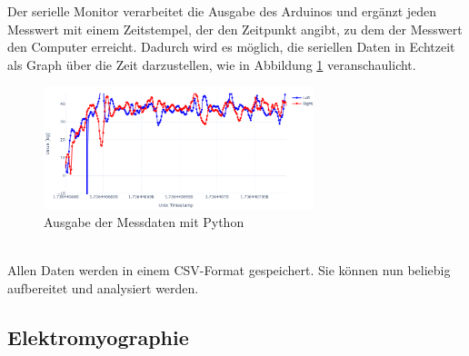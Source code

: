 Der serielle Monitor verarbeitet die Ausgabe des Arduinos und ergänzt jeden Messwert mit einem Zeitstempel, der den Zeitpunkt angibt, zu dem der Messwert den Computer erreicht. Dadurch wird es möglich, die seriellen Daten in Echtzeit als Graph über die Zeit darzustellen, wie in Abbildung \ref{fig:serial_output} veranschaulicht.
\begin{figure}[h!]
    \centering
    \includegraphics[width=0.7\textwidth]{img/serial_output_example.png} %
    \caption{Ausgabe der Messdaten mit Python}
    \label{fig:serial_output}
\end{figure}
\\
Allen Daten werden in einem CSV-Format gespeichert.
Sie können nun beliebig aufbereitet und analysiert werden.






\subsection{Elektromyographie}

